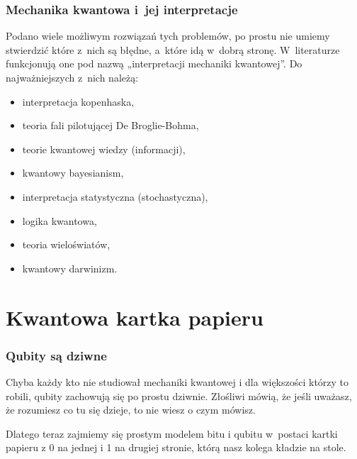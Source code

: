 \documentclass[10pt,t]{beamer}
\begin{document}
\begin{frame}
  \frametitle{Mechanika kwantowa i~jej interpretacje}


  Podano wiele możliwym rozwiązań tych problemów, po prostu nie umiemy
  stwierdzić które z~nich są błędne, a~które idą w~dobrą stronę.
  W~literaturze funkcjonują one pod nazwą „interpretacji mechaniki
  kwantowej”. Do najważniejszych z~nich należą:
  \begin{itemize}
    \RaggedRight

  \item interpretacja kopenhaska,

  \item teoria fali pilotującej De Broglie-Bohma,

  \item teorie kwantowej wiedzy (informacji),

  \item kwantowy bayesianism,

  \item interpretacja statystyczna (stochastyczna),

  \item logika kwantowa,

  \item teoria wieloświatów,

  \item kwantowy darwinizm.

  \end{itemize}

\end{frame}





\section{Kwantowa kartka papieru}





\begin{frame}
  \frametitle{Qubity są dziwne}


  Chyba każdy kto nie studiował mechaniki kwantowej i dla większości
  którzy to robili, qubity zachowują się po prostu dziwnie. Złośliwi
  mówią, że jeśli uważasz, że rozumiesz co tu się dzieje, to nie wiesz
  o czym mówisz.

  Dlatego teraz zajmiemy się prostym modelem bitu i qubitu w~postaci
  kartki papieru z 0 na jednej i 1 na drugiej stronie, którą nasz
  kolega kładzie na stole.

\end{frame}
\end{document}
